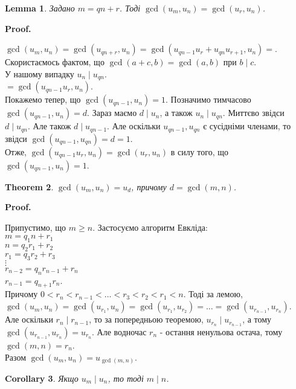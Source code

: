 \documentclass[a4paper, 14pt]{extarticle}
\makeatletter
\theoremstyle{theoremdd}
\newtheorem{theorem}{Theorem}[subsection]
\theoremstyle{theoremdd}
\theoremstyle{theoremdd}
\theoremstyle{theoremdd}
\theoremstyle{theoremdd}
\theoremstyle{theoremdd}
\theoremstyle{theoremdd}
\newtheorem{lemma}[theorem]{Lemma}
\theoremstyle{theoremdd}
\newtheorem{corollary}[theorem]{Corollary}
\def\qed{$\blacksquare$}
\renewenvironment{proof}[1][Proof.\\]{\par
\pushQED{\hfill \qed}%
\normalfont \topsep6\p@\@plus6\p@\relax
\trivlist
\item\relax
{\bfseries
#1\@addpunct{.}}\hspace\labelsep\ignorespaces
}{%
\popQED\endtrivlist\@endpefalse
}
\makeatother
\begin{document}
\begin{lemma}
Задано $m = qn + r$. Тоді $\gcd(u_m,u_n) = \gcd(u_r,u_n)$.
\end{lemma}

\begin{proof}
$\gcd(u_m,u_n) = \gcd(u_{qn+r},u_n) = \gcd(u_{qn-1}u_r+u_{qn}u_{r+1},u_n) \boxed{=}$.\\
Скористаємось фактом, що $\gcd(a+c,b) = \gcd(a,b)$ при $b \mid c$.\\
У нашому випадку $u_n \mid u_{qn}$.\\
$\boxed{=} \gcd(u_{qn-1}u_r,u_n)$.\\
Покажемо тепер, що $\gcd(u_{qn-1},u_n) = 1$. Позначимо тимчасово $\gcd(u_{qn-1},u_n) = d$. Зараз маємо $d \mid u_n$, а також $u_n \mid u_{qn}$. Миттєво звідси $d \mid u_{qn}$. Але також $d \mid u_{qn-1}$. Але оскільки $u_{qn-1}, u_{qn}$ є сусідніми членами, то звідси $\gcd(u_{qn-1},u_{qn}) = d = 1$.\\
Отже, $\gcd(u_{qn-1}u_r,u_n) = \gcd(u_r,u_n)$ в силу того, що $\gcd(u_{qn-1},u_n) = 1$. 
\end{proof}

\begin{theorem}
$\gcd(u_m,u_n) = u_d$, причому $d = \gcd(m,n)$.
\end{theorem}

\begin{proof}
Припустимо, що $m \geq n$. Застосуємо алгоритм Евкліда:\\
$m = q_1n + r_1$\\
$n = q_2r_1 + r_2$\\
$r_1 = q_3r_2 + r_3$\\
$\vdots$\\
$r_{n-2} = q_nr_{n-1} +r_n$\\
$r_{n-1} = q_{n+1}r_n$.\\
Причому $0 < r_n < r_{n-1} < \dots < r_3 < r_2 < r_1 < n$. Тоді за лемою,\\
$\gcd(u_m,u_n) = \gcd(u_{r_1},u_n) = \gcd(u_{r_1},u_{r_2}) = \dots = \gcd(u_{r_{n-1}},u_{r_n})$.\\
Але оскільки $r_n \mid r_{n-1}$, то за попередньою теоремою, $u_{r_n} \mid u_{r_{n-1}}$, а тому $\gcd(u_{r_{n-1}},u_{r_n}) = u_{r_n}$. Але водночас $r_n$ - остання ненульова остача, тому $\gcd(m,n) = r_n$.\\
Разом $\gcd(u_m,u_n) = u_{\gcd(m,n)}$.
\end{proof}

\begin{corollary}
Якщо $u_m \mid u_n$, то тоді $m \mid n$.
\end{corollary}
\end{document}
